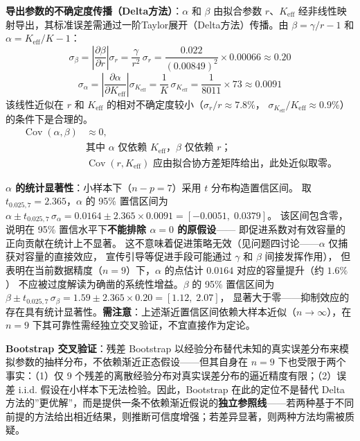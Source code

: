 \documentclass[12pt,a4paper]{ctexart}
\begin{document}
\textbf{导出参数的不确定度传播（Delta方法）}：$\alpha$ 和 $\beta$ 由拟合参数 $r$、$K_{\text{eff}}$ 经非线性映射导出，其标准误差需通过一阶Taylor展开（Delta方法）传播。由 $\beta = \gamma/r - 1$ 和 $\alpha = K_{\text{eff}}/K - 1$：
\begin{equation}
\sigma_\beta = \left|\frac{\partial\beta}{\partial r}\right| \sigma_r
             = \frac{\gamma}{r^2}\,\sigma_r
             = \frac{0.022}{(0.00849)^2} \times 0.00066
             \approx 0.20
\end{equation}
\begin{equation}
\sigma_\alpha = \left|\frac{\partial\alpha}{\partial K_{\text{eff}}}\right| \sigma_{K_{\text{eff}}}
              = \frac{1}{K}\,\sigma_{K_{\text{eff}}}
              = \frac{1}{8011} \times 73
              \approx 0.0091
\end{equation}
该线性近似在 $r$ 和 $K_{\text{eff}}$ 的相对不确定度较小（$\sigma_r/r \approx 7.8\%$，
$\sigma_{K_{\text{eff}}}/K_{\text{eff}} \approx 0.9\%$）的条件下是合理的。
\begin{equation}
\begin{aligned}
\operatorname{Cov}(\alpha,\beta) &\approx 0,\\
&\text{其中 $\alpha$ 仅依赖 $K_{\text{eff}}$，$\beta$ 仅依赖 $r$；}\\
&\text{$\operatorname{Cov}(r,K_{\text{eff}})$ 应由拟合协方差矩阵给出，此处近似取零。}
\end{aligned}
\end{equation}

\textbf{$\alpha$ 的统计显著性}：小样本下（$n-p=7$）采用 $t$ 分布构造置信区间。
取 $t_{0.025,7}=2.365$，$\alpha$ 的 95\% 置信区间为
$\alpha \pm t_{0.025,7}\,\sigma_\alpha = 0.0164 \pm 2.365 \times 0.0091 = [-0.0051,\;0.0379]$。
该区间包含零，说明在 95\% 置信水平下\textbf{不能排除 $\alpha = 0$ 的原假设}——
即促进系数对有效容量的正向贡献在统计上不显著。
这不意味着促进策略无效（见问题四讨论——$\alpha$ 仅捕获对容量的直接效应，
宣传引导等促进手段可能通过 $\gamma$ 和 $\beta$ 间接发挥作用），
但表明在当前数据精度（$n=9$）下，$\alpha$ 的点估计 $0.0164$ 对应的容量提升（约 $1.6\%$）
不应被过度解读为确凿的系统性增益。$\beta$ 的 95\% 置信区间为
$\beta \pm t_{0.025,7}\,\sigma_\beta = 1.59 \pm 2.365 \times 0.20 = [1.12,\;2.07]$，
显著大于零——抑制效应的存在具有统计显著性。\textbf{需注意}：上述渐近置信区间依赖大样本近似（$n \to \infty$），在 $n=9$ 下其可靠性需经独立交叉验证，不宜直接作为定论。

\textbf{Bootstrap 交叉验证}：残差 Bootstrap\cite{efron} 以经验分布替代未知的真实误差分布来模拟参数的抽样分布，不依赖渐近正态假设——但其自身在 $n=9$ 下也受限于两个事实：（1）仅 9 个残差的离散经验分布对真实误差分布的逼近精度有限；（2）误差 i.i.d. 假设在小样本下无法检验。因此，Bootstrap 在此的定位不是替代 Delta 方法的''更优解''，而是提供一条不依赖渐近假说的\textbf{独立参照线}——若两种基于不同前提的方法给出相近结果，则推断可信度增强；若差异显著，则两种方法均需被质疑。
\end{document}
